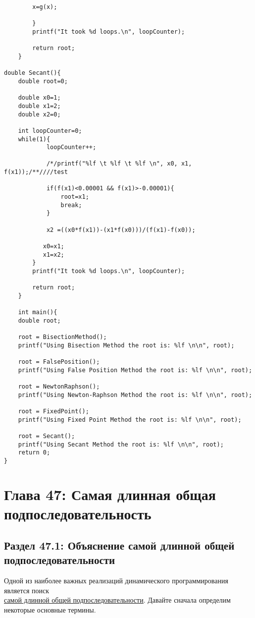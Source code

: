 \begin{tcolorbox}
\begin{verbatim}
		x=g(x);
		
		}
		printf("It took %d loops.\n", loopCounter);
		
		return root;
	}

double Secant(){
	double root=0;
	
	double x0=1;
	double x1=2;
	double x2=0;
	
	int loopCounter=0;
	while(1){
			loopCounter++;
			
			/*/printf("%lf \t %lf \t %lf \n", x0, x1, f(x1));/**////test
			
			if(f(x1)<0.00001 && f(x1)>-0.00001){
				root=x1;
				break;
			}
			
			x2 =((x0*f(x1))-(x1*f(x0)))/(f(x1)-f(x0));
			
		   x0=x1;
		   x1=x2;
		}
		printf("It took %d loops.\n", loopCounter);
		
		return root;
	}
	
	int main(){
	double root;
	
	root = BisectionMethod();
	printf("Using Bisection Method the root is: %lf \n\n", root);
	
	root = FalsePosition();
	printf("Using False Position Method the root is: %lf \n\n", root);
	
	root = NewtonRaphson();
	printf("Using Newton-Raphson Method the root is: %lf \n\n", root);
	
	root = FixedPoint();
	printf("Using Fixed Point Method the root is: %lf \n\n", root);
	
	root = Secant();
	printf("Using Secant Method the root is: %lf \n\n", root);
	return 0;
}
\end{verbatim}
\end{tcolorbox}
\vspace{\baselineskip}

\newpage
\chapter*{Глава 47: Самая длинная общая подпоследовательность}
\section*{Раздел 47.1: Объяснение самой длинной общей подпоследовательности}
Одной из наиболее важных реализаций динамического программирования
является поиск\\ \href{https://en.wikipedia.org/wiki/Longest_common_subsequence_problem}{\underline{самой длинной общей подпоследовательности}}. Давайте
сначала определим некоторые основные термины.
\vspace{\baselineskip}

